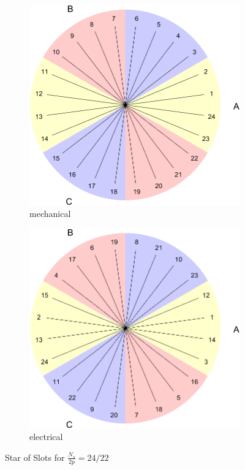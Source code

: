 \documentclass[a4paper, 11pt]{article}
\begin{document}
\begin{figure}[h]
    \centering
    \begin{subfigure}[b]{0.45\textwidth}
        \includegraphics[width=\textwidth]{Q2_2422_starofSlots_mechanical.png}
        \caption{mechanical}
        \label{subfig:sos_2422_mech}
    \end{subfigure}
    \begin{subfigure}[b]{0.45\textwidth}
        \includegraphics[width=\textwidth]{Q2_2422_starofSlots_electrical.png}
        \caption{electrical}
        \label{subfig:sos_2422_elec}
    \end{subfigure}
    \caption{Star of Slots for $\frac{N_s}{2p}=24/22$}
    \label{fig:sos_2422}
\end{figure}
\end{document}
